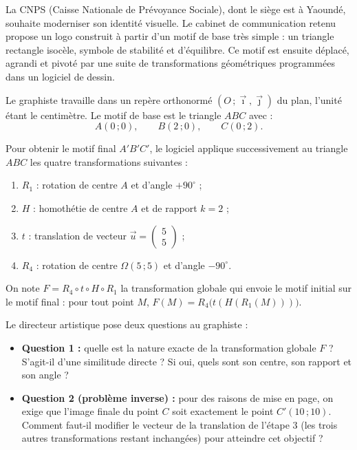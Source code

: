 \documentclass[11pt]{article}
\newcommand{\cle}[1]{{\popxbold\color{popdark}#1}}
\newcounter{popsec}
\newcounter{popsub}
\newcommand{\courssub}[1]{%
  \stepcounter{popsub}%
  \par\vspace{9pt}\noindent{\popxbold\fontsize{11.5}{13}\selectfont\color{popink}{\color{poporange}\thepopsec.\thepopsub}\hspace{6pt}#1}\par\nopagebreak\vspace{4pt}
}
\begin{document}
\courssub{Situation}

La \cle{CNPS} (Caisse Nationale de Prévoyance Sociale), dont le siège est à Yaoundé, souhaite moderniser son identité visuelle. Le cabinet de communication retenu propose un logo construit à partir d'un \cle{motif de base} très simple : un triangle rectangle isocèle, symbole de stabilité et d'équilibre. Ce motif est ensuite déplacé, agrandi et pivoté par une suite de transformations géométriques programmées dans un logiciel de dessin.

Le graphiste travaille dans un repère orthonormé $(O\,;\vec{\imath},\vec{\jmath})$ du plan, l'unité étant le centimètre. Le motif de base est le triangle $ABC$ avec :
\[ A(0\,;0), \qquad B(2\,;0), \qquad C(0\,;2). \]

Pour obtenir le motif final $A'B'C'$, le logiciel applique successivement au triangle $ABC$ les quatre transformations suivantes :

\begin{enumerate}
\item $R_1$ : rotation de centre $A$ et d'angle $+90^\circ$ ;
\item $H$ : homothétie de centre $A$ et de rapport $k = 2$ ;
\item $t$ : translation de vecteur $\vec{u} = \begin{pmatrix} 5 \\ 5 \end{pmatrix}$ ;
\item $R_4$ : rotation de centre $\Omega(5\,;5)$ et d'angle $-90^\circ$.
\end{enumerate}

On note $F = R_4 \circ t \circ H \circ R_1$ la transformation globale qui envoie le motif initial sur le motif final : pour tout point $M$, $F(M) = R_4\bigl(t(H(R_1(M)))\bigr)$.

Le directeur artistique pose deux questions au graphiste :
\begin{itemize}
\item \textbf{Question 1 :} quelle est la nature exacte de la transformation globale $F$ ? S'agit-il d'une similitude directe ? Si oui, quels sont son centre, son rapport et son angle ?
\item \textbf{Question 2 (problème inverse) :} pour des raisons de mise en page, on exige que l'image finale du point $C$ soit exactement le point $C'(10\,;10)$. Comment faut-il modifier le vecteur de la translation de l'étape 3 (les trois autres transformations restant inchangées) pour atteindre cet objectif ?
\end{itemize}
\end{document}
